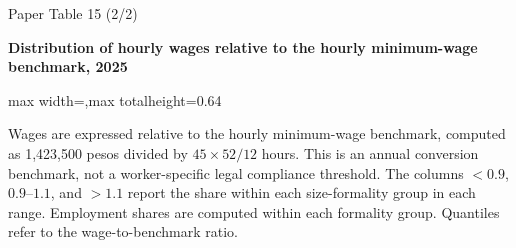 \begin{frame}{Paper Table 15 (2/2)}
\begin{minipage}{\textwidth}\small\textbf{Distribution of hourly wages relative to the hourly minimum-wage benchmark, 2025}\end{minipage}\par\vspace{0.15cm}
\centering\begingroup\fontsize{8.5}{10}\selectfont
\setlength{\tabcolsep}{4pt}\renewcommand{\arraystretch}{1.06}
\begin{adjustbox}{max width=\textwidth,max totalheight=0.64\textheight}

\end{adjustbox}\endgroup\par\vspace{0.10cm}
{\fontsize{6.5}{7.5}\selectfont\raggedright Wages are expressed relative to the hourly minimum-wage benchmark, computed as 1,423,500 pesos divided by $45\times52/12$ hours. This is an annual conversion benchmark, not a worker-specific legal compliance threshold. The columns $<0.9$, $0.9$--$1.1$, and $>1.1$ report the share within each size-formality group in each range. Employment shares are computed within each formality group. Quantiles refer to the wage-to-benchmark ratio.\par}
\end{frame}

